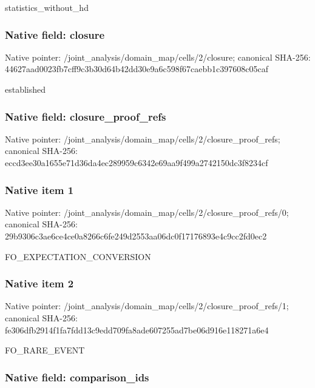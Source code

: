 \documentclass[10pt,a4paper]{article}
\begin{document}
statistics\_without\_hd


\subsubsection{Native field: closure}


Native pointer: /joint\_analysis/domain\_m\allowbreak{}ap/cells/2/closure; canonical SHA-256: 44627aad0023fb7cff9c3b30\allowbreak{}d64b42dd30e9a6c598f67cae\allowbreak{}bb1c397608c05caf


established


\subsubsection{Native field: closure\_proof\_refs}


Native pointer: /joint\_analysis/domain\_m\allowbreak{}ap/cells/2/closure\_proof\allowbreak{}\_refs; canonical SHA-256: eccd3ee30a1655e71d36da4e\allowbreak{}c289959c6342e69aa9f499a2\allowbreak{}742150dc3f8234cf



\subsubsection{Native item 1}


Native pointer: /joint\_analysis/domain\_m\allowbreak{}ap/cells/2/closure\_proof\allowbreak{}\_refs/0; canonical SHA-256: 29b9306c3ae6ce4ce0a8266c\allowbreak{}6fe249d2553aa06dc0f17176\allowbreak{}893e4c9cc2fd0ec2


FO\_EXPECTATION\_CONVERSION


\subsubsection{Native item 2}


Native pointer: /joint\_analysis/domain\_m\allowbreak{}ap/cells/2/closure\_proof\allowbreak{}\_refs/1; canonical SHA-256: fe306dfb2914f1fa7fdd13c9\allowbreak{}edd709fa8ade607255ad7be0\allowbreak{}6d916e118271a6e4


FO\_RARE\_EVENT


\subsubsection{Native field: comparison\_ids}
\end{document}
